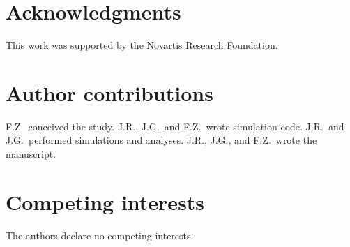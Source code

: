 \documentclass[11pt,a4paper]{article}
\begin{document}
\clearpage
\section*{Acknowledgments}
This work was supported by the Novartis Research Foundation. 

\section*{Author contributions}
F.Z.\ conceived the study. 
J.R., J.G.\ and F.Z.\ wrote simulation code.
J.R.\ and J.G.\ performed simulations and analyses. 
J.R., J.G., and F.Z.\ wrote the manuscript.

\section*{Competing interests}
The authors declare no competing interests.




\printbibliography
\end{document}
